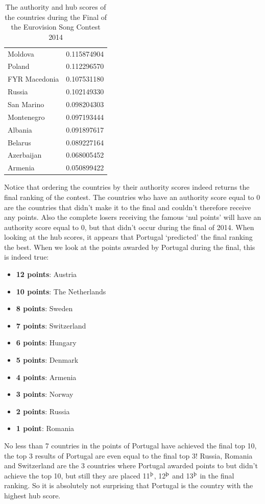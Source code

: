 \documentclass[a4paper,11pt]{report}
\begin{document}
\begin{table}[h!]
\begin{tabular}{l|r}
Moldova         & 0.115874904 \\
Poland          & 0.112296570  \\
FYR Macedonia   & 0.107531180  \\
Russia          & 0.102149330  \\
San Marino      & 0.098204303 \\
Montenegro      & 0.097193444 \\
Albania         & 0.091897617 \\
Belarus         & 0.089227164 \\
Azerbaijan      & 0.068005452 \\
Armenia         & 0.050899422
\end{tabular}

\caption{The authority and hub scores of the countries during the Final of the Eurovision Song Contest 2014}
\end{table}\label{t2014}

Notice that ordering the countries by their authority scores indeed returns the final ranking of the contest. The countries who have an
authority score equal to 0 are the countries that didn't make it to the final and couldn't therefore 
receive any points. Also the complete losers receiving the famous `nul points' will have an authority score
equal to 0, but that didn't occur during the final of 2014. When looking at the hub scores, it appears that Portugal `predicted' the 
final ranking the best. When we look at the points awarded by Portugal during 
the final, this is indeed true:
\begin{itemize}
  \itemsep0em

  \item \textbf{12 points}: Austria
\item \textbf{10 points}: The Netherlands
\item \textbf{8 points}: Sweden
\item \textbf{7 points}: Switzerland	
\item \textbf{6 points}: Hungary
\item \textbf{5 points}: Denmark
\item \textbf{4 points}: Armenia	
\item \textbf{3 points}: Norway
\item \textbf{2 points}: Russia
\item \textbf{1 point}: Romania
\end{itemize}
No less than 7 countries in the points of Portugal have achieved the final top 
10, the top 3 results of Portugal are even equal to the final top 3! Russia, Romania and
Switzerland are the 3 countries where Portugal awarded points to but didn't achieve the 
top 10, but still they are placed 11$^\text{\th}$, 12$^\text{\th}$ and 
13$^\text{\th}$ in the final ranking. So it is absolutely not surprising that Portugal is the country 
with the highest hub score. 
\end{document}
